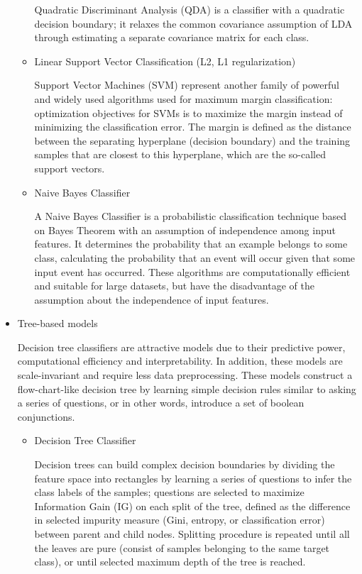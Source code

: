 \begin{itemize}
\begin{itemize}
        Quadratic Discriminant Analysis (QDA) is a classifier with a quadratic decision boundary;
        it relaxes the common covariance assumption of LDA through estimating a separate covariance matrix for each class.

        \item Linear Support Vector Classification (L2, L1 regularization)

        Support Vector Machines (SVM) represent another family of powerful and widely used algorithms used for maximum margin classification: optimization objectives for SVMs is to maximize the margin instead of minimizing the classification error.
        The margin is defined as the distance between the separating hyperplane (decision boundary) and the training samples that are closest to this hyperplane, which are the so-called support vectors\cite{RaschkaMirjalili2017}.

        \item Naive Bayes Classifier

        A Naive Bayes Classifier is a probabilistic classification technique based on Bayes Theorem with an assumption of independence among input features.
        It determines the probability that an example belongs to some class, calculating the probability that an event will occur given that some input event has occurred.
        These algorithms are computationally efficient and suitable for large datasets, but have the disadvantage of the assumption about the independence of input features.

    \end{itemize}

    \item Tree-based models

    Decision tree classifiers are attractive models due to their predictive power, computational efficiency and interpretability.
    In addition, these models are scale-invariant and require less data preprocessing.
    These models construct a flow-chart-like decision tree by learning simple decision rules similar to asking a series of questions, or in other words, introduce a set of boolean conjunctions.

    \begin{itemize}

        \item Decision Tree Classifier

        Decision trees can build complex decision boundaries by dividing the feature space into rectangles by learning a series of questions to infer the class labels of the samples;
        questions are selected to maximize Information Gain (IG) on each split of the tree, defined as the difference in selected impurity measure (Gini, entropy, or classification error) between parent and child nodes.
        Splitting procedure is repeated until all the leaves are pure (consist of samples belonging to the same target class), or until selected maximum depth of the tree is reached.


\end{itemize}
\end{itemize}
